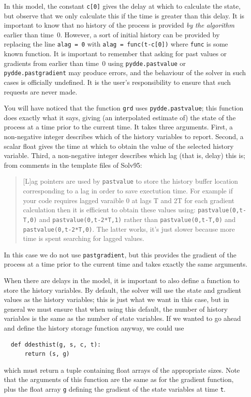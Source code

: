 \documentclass[10pt,a4paper] {article}
\begin{document}
In this model, the constant \verb+c[0]+ gives the delay at which to calculate the state, but observe that we only calculate this if the time is greater than this delay.  It is important to know that no history of the process is provided \emph{by the algorithm} earlier than time~$0$.  However, a sort of initial history can be provided by replacing the line \verb+alag = 0+ with \verb+alag = func(t-c[0])+ where \verb+func+ is some known function.  It is important to remember that asking for past values or gradients from earlier than time~$0$ using \verb+pydde.pastvalue+ or \verb+pydde.pastgradient+ may produce errors, and the behaviour of the solver in such cases is officially undefined.  It is the user's responsibility to ensure that such requests are never made.

You will have noticed that the function \verb+grd+ uses \verb+pydde.pastvalue+; this function does exactly what it says, giving (an interpolated estimate of) the state of the process at a time prior to the current time.  It takes three arguments.  First, a non-negative integer describes which of the history variables to report.  Second, a scalar float gives the time at which to obtain the value of the selected history variable.  Third, a non-negative integer describes which lag (that is, delay) this is; from comments in the template files of Solv95:
\begin{quotation}
[L]ag pointers are used by \verb+pastvalue+ to store the history buffer location corresponding to a lag in order to save exectution time.  For example if your code requires lagged varaible 0 at lags T and 2T for each gradient calculation then it is efficient to obtain these values using: \verb+pastvalue(0,t-T,0)+ and \verb+pastvalue(0,t-2*T,1)+ rather than \verb+pastvalue(0,t-T,0)+ and \verb+pastvalue(0,t-2*T,0)+.  The latter works, it's just slower because more time is spent searching for lagged values.
\end{quotation}
In this case we do not use \verb+pastgradient+, but this provides the gradient of the process at a time prior to the current time and takes exactly the same arguments.

When there are delays in the model, it is important to also define a function to store the history variables.  By default, the solver will use the state and gradient values as the history variables; this is just what we want in this case, but in general we must ensure that when using this default, the number of history variables is the same as the number of state variables.  If we wanted to go ahead and define the history storage function anyway, we could use
\begin{verbatim}
  def ddesthist(g, s, c, t):
      return (s, g)
\end{verbatim}
which must return a tuple containing float arrays of the appropriate sizes.  Note that the arguments of this function are the same as for the gradient function, plus the float array \verb+g+ defining the gradient of the state variables at time \verb+t+.
\end{document}
